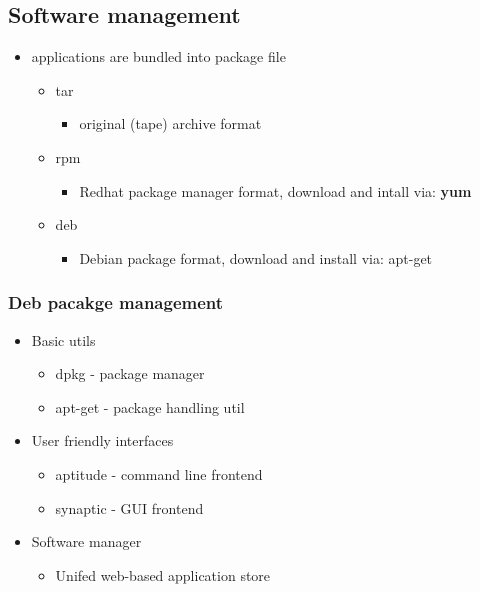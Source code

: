 \documentclass{report}
\begin{document}
    \subsection{Software management}
    \begin{itemize}
        \item applications are bundled into package file
            \begin{itemize}
                \item tar
                    \begin{itemize}
                        \item original (tape) archive format
                    \end{itemize}
                \item rpm
                    \begin{itemize}
                        \item Redhat package manager format, download and intall via: \textbf{yum}
                    \end{itemize}
                \item deb
                    \begin{itemize}
                        \item Debian package format, download and install via: apt-get 
                    \end{itemize}
            \end{itemize}
    \end{itemize}

    \bigbreak \noindent 
    \subsubsection{Deb pacakge management}
    \begin{itemize}
        \item Basic utils
            \begin{itemize}
                \item dpkg - package manager
                \item apt-get - package handling util
            \end{itemize}
        \item User friendly interfaces
            \begin{itemize}
                \item aptitude - command line frontend
                \item synaptic - GUI frontend
            \end{itemize}
        \item Software manager
            \begin{itemize}
                \item Unifed web-based application store
            \end{itemize}
    \end{itemize}
\end{document}
